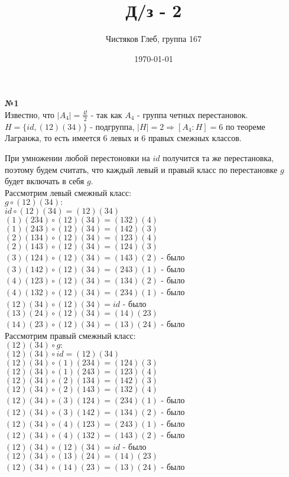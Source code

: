 \documentclass[a4paper, 12pt]{article}
\title{Д/з - 2}
\author{Чистяков Глеб, группа 167}
\date{\today}
\begin{document}
	
	\maketitle
	
	\textbf{№1} \\
	
	Известно, что $|A_4| = \frac{4!}{2}$ - так как $A_4$ - группа четных перестановок. $H = \{id, (12)(34)\}$ - подгруппа, $|H| = 2 \Rightarrow [A_4:H] = 6$ по теореме Лагранжа, то есть имеется 6 левых и 6 правых смежных классов.
	
	При умножении любой перестоновки на $id$ получится та же перестановка, поэтому будем считать, что каждый левый и правый класс по перестановке $g$ будет включать в себя $g$. \\
	
	
	Рассмотрим левый смежный класс: \\
	$g \circ (12)(34):$ \\
	$id \circ (12)(34) = (12)(34)$ \\
	$(1)(234) \circ (12)(34) = (132)(4)$ \\
	$(1)(243) \circ (12)(34) = (142)(3)$ \\
	$(2)(134) \circ (12)(34) = (123)(4)$ \\
	$(2)(143) \circ (12)(34) = (124)(3)$ \\
	$(3)(124) \circ (12)(34) = (143)(2)$ - было \\
	$(3)(142) \circ (12)(34) = (243)(1)$ - было \\
	$(4)(123) \circ (12)(34) = (134)(2)$ - было \\
	$(4)(132) \circ (12)(34) = (234)(1)$ - было \\
	$(12)(34) \circ (12)(34) = id$ - было \\
	$(13)(24) \circ (12)(34) = (14)(23)$ \\
	$(14)(23) \circ (12)(34) = (13)(24)$ - было \\
	
		Рассмотрим правый смежный класс: \\
	$(12)(34) \circ g:$ \\
	$(12)(34) \circ id = (12)(34)$ \\
	$(12)(34) \circ (1)(234) = (124)(3)$ \\
	$(12)(34) \circ (1)(243) = (123)(4)$ \\
	$(12)(34) \circ (2)(134) = (142)(3)$ \\
	$(12)(34) \circ (2)(143) = (132)(4)$ \\
	$(12)(34) \circ (3)(124) = (234)(1)$ - было \\
	$(12)(34) \circ (3)(142) = (134)(2)$ - было \\
	$(12)(34) \circ (4)(123) = (243)(1)$ - было \\
	$(12)(34) \circ (4)(132) = (143)(2)$ - было \\
	$(12)(34) \circ (12)(34) = id$ - было \\
	$(12)(34) \circ (13)(24) = (14)(23)$ \\
	$(12)(34) \circ (14)(23) = (13)(24)$ - было \\
	
\end{document}
